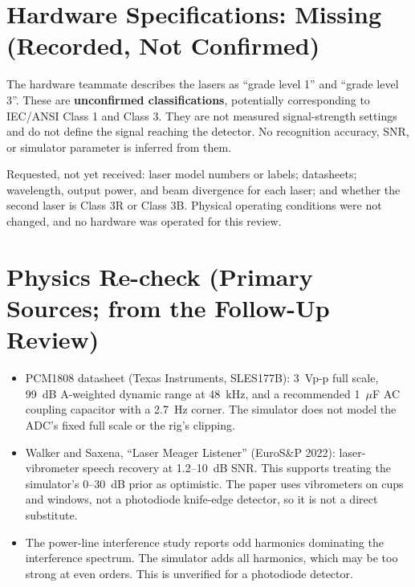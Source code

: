 \documentclass{article}
\begin{document}
\section{Hardware Specifications: Missing (Recorded, Not Confirmed)}\label{sec:hw}
The hardware teammate describes the lasers as ``grade level 1'' and ``grade level 3''. These are \textbf{unconfirmed classifications}, potentially corresponding to IEC/ANSI Class 1 and Class 3. They are not measured signal-strength settings and do not define the signal reaching the detector. No recognition accuracy, SNR, or simulator parameter is inferred from them.

Requested, not yet received: laser model numbers or labels; datasheets; wavelength, output power, and beam divergence for each laser; and whether the second laser is Class 3R or Class 3B. Physical operating conditions were not changed, and no hardware was operated for this review.

\section{Physics Re-check (Primary Sources; from the Follow-Up Review)}
\begin{itemize}[leftmargin=0.25in]
\item PCM1808 datasheet (Texas Instruments, SLES177B): 3~Vp-p full scale, 99~dB A-weighted dynamic range at 48~kHz, and a recommended 1~$\mu$F AC coupling capacitor with a 2.7~Hz corner. The simulator does not model the ADC's fixed full scale or the rig's clipping.
\item Walker and Saxena, ``Laser Meager Listener'' (EuroS\&P 2022): laser-vibrometer speech recovery at 1.2--10~dB SNR. This supports treating the simulator's 0--30~dB prior as optimistic. The paper uses vibrometers on cups and windows, not a photodiode knife-edge detector, so it is not a direct substitute.
\item The power-line interference study reports odd harmonics dominating the interference spectrum. The simulator adds all harmonics, which may be too strong at even orders. This is unverified for a photodiode detector.
\end{itemize}
\end{document}
